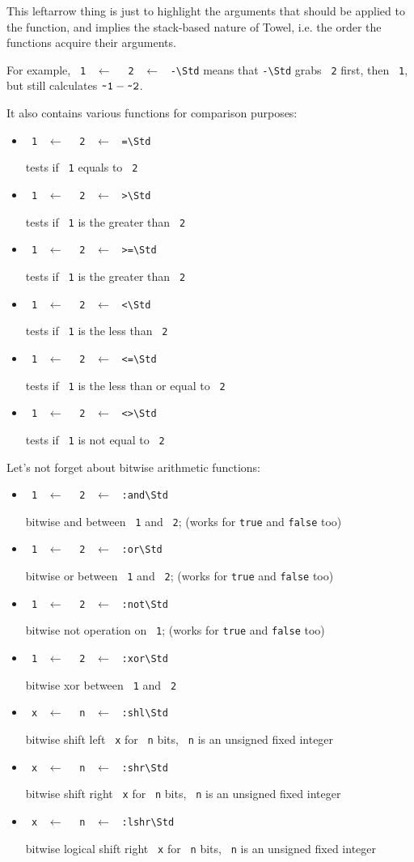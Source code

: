 \documentclass{report}
\newcommand{\mstd}[1]{\texttt{#1\textbackslash Std}}
\newcommand{\mtilde}[1]{\textasciitilde}
\newcommand{\marg}[1]{\texttt{\mtilde ~#1}}
\newcommand{\mla}[0]{~$\leftarrow$ ~}
\newcommand{\arithstd}[1]{\marg{1} \mla \marg{2} \mla \mstd{#1}}
\begin{document}
\begin{mdframed}[style=hint]
  This leftarrow thing is just to highlight the arguments that should be applied to the function, and implies the stack-based nature of Towel, i.e. the order the functions acquire their arguments.

  For example, \arithstd{-} means that \mstd{-} grabs \marg2 first, then \marg1, but still calculates $\marg1 - \marg2$.
\end{mdframed}

It also contains various functions for comparison purposes:

\begin{itemize}
\item \arithstd{=}

tests if \marg1 equals to \marg2
\item \arithstd{>}

tests if \marg1 is the greater than \marg2
\item \arithstd{>=}

tests if \marg1 is the greater than \marg2
\item \arithstd{<}

tests if \marg1 is the less than \marg2
\item \arithstd{<=}

tests if \marg1 is the less than or equal to \marg2
\item \arithstd{<>}

tests if \marg1 is not equal to \marg2
\end{itemize}

Let's not forget about bitwise arithmetic functions:

\begin{itemize}
\item \arithstd{:and}

bitwise and between \marg1 and \marg2; (works for \texttt{true} and \texttt{false} too)
\item \arithstd{:or}

bitwise or between \marg1 and \marg2; (works for \texttt{true} and \texttt{false} too)
\item \arithstd{:not}

bitwise not operation on \marg1; (works for \texttt{true} and \texttt{false} too)
\item \arithstd{:xor}

bitwise xor between \marg1 and \marg2
\item \marg{x} \mla \marg{n} \mla \mstd{:shl}

bitwise shift left \marg{x} for \marg{n} bits, \marg{n} is an unsigned fixed integer
\item \marg{x} \mla \marg{n} \mla \mstd{:shr}

bitwise shift right \marg{x} for \marg{n} bits, \marg{n} is an unsigned fixed integer
\item \marg{x} \mla \marg{n} \mla \mstd{:lshr}

bitwise logical shift right \marg{x} for \marg{n} bits, \marg{n} is an unsigned fixed integer
\end{itemize}
\end{document}
